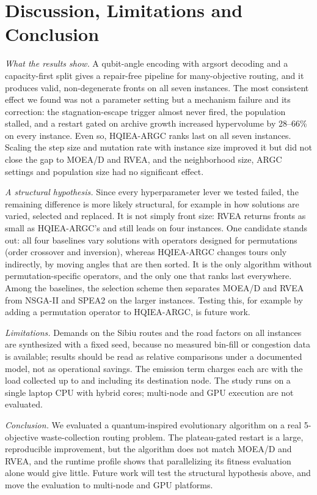 \section{Discussion, Limitations and Conclusion}
\label{sec:conclusion}

\emph{What the results show.} A qubit-angle encoding with argsort decoding and a
capacity-first split gives a repair-free pipeline for many-objective routing, and
it produces valid, non-degenerate fronts on all seven instances. The most
consistent effect we found was not a parameter setting but a mechanism failure
and its correction: the stagnation-escape trigger almost never fired, the
population stalled, and a restart gated on archive growth increased hypervolume by
28--66\% on every instance. Even so, HQIEA-ARGC ranks last on all seven
instances. Scaling the step size and mutation rate with instance size improved
it but did not close the gap to MOEA/D and RVEA, and the neighborhood size, ARGC
settings and population size had no significant effect.

\emph{A structural hypothesis.} Since every hyperparameter lever we tested
failed, the remaining difference is more likely structural, for example in how
solutions are varied, selected and replaced. It is not simply front size: RVEA
returns fronts as small as HQIEA-ARGC's and still leads on four instances. One
candidate stands out: all four baselines vary solutions with operators designed
for permutations (order crossover and inversion), whereas HQIEA-ARGC changes
tours only indirectly, by moving angles that are then sorted. It is the only
algorithm without permutation-specific operators, and the only one that ranks
last everywhere. Among the baselines, the selection scheme then separates
MOEA/D and RVEA from NSGA-II and SPEA2 on the larger instances. Testing this, for
example by adding a permutation operator to HQIEA-ARGC, is future work.

\emph{Limitations.} Demands on the Sibiu routes and the road factors on all
instances are synthesized with a fixed seed, because no measured bin-fill or
congestion data is available; results should be read as relative comparisons
under a documented model, not as operational savings. The emission term charges
each arc with the load collected up to and including its destination node. The
study runs on a single laptop CPU with hybrid cores; multi-node and GPU
execution are not evaluated.

\emph{Conclusion.} We evaluated a quantum-inspired evolutionary algorithm on a
real 5-objective waste-collection routing problem. The plateau-gated restart is a
large, reproducible improvement, but the algorithm does not match MOEA/D and RVEA,
and the runtime profile shows that parallelizing its fitness evaluation alone
would give little. Future work will test the structural hypothesis above, and
move the evaluation to multi-node and GPU platforms.

